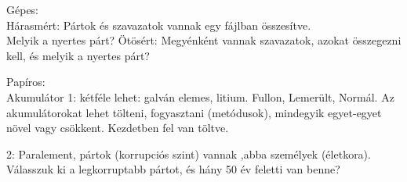 \documentclass[12pt,a4paper]{article}
\begin{document}
Gépes: \\ 
Hárasmért: Pártok és szavazatok vannak egy fájlban összesítve. \\ 
Melyik a nyertes párt?
Ötösért: Megyénként vannak szavazatok, azokat összegezni kell, és melyik a nyertes párt?

Papíros: \\
Akumulátor 
1: kétféle lehet: galván elemes, litium. Fullon, Lemerült, Normál. Az akumulátorokat lehet tölteni, fogyasztani (metódusok), mindegyik egyet-egyet növel vagy csökkent. Kezdetben fel van töltve.

2: Paralement, pártok (korrupciós szint) vannak ,abba személyek (életkora). Válasszuk ki a legkorruptabb pártot, és hány 50 év feletti van benne? 
\end{document}
